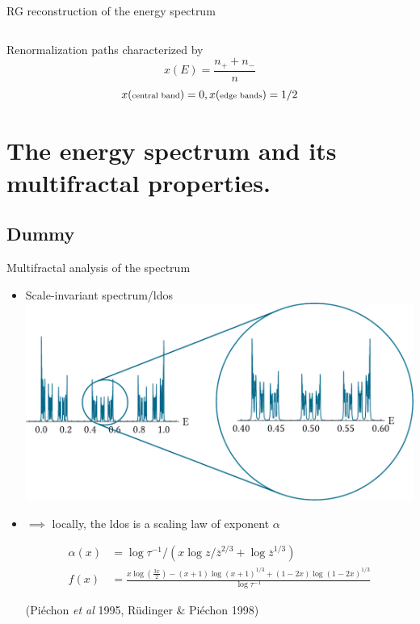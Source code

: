 \documentclass[xcolor=x11names,compress,professionalfonts]{beamer}
\renewcommand{\(}{\begin{columns}}
\renewcommand{\)}{\end{columns}}
\newcommand{\<}[1]{\begin{column}{#1}}
\renewcommand{\>}{\end{column}}
\newcommand{\zb}{\ensuremath{\overline{z}}}
\begin{document}
\begin{frame}{RG reconstruction of the energy spectrum}
\begin{columns}
\begin{column}{6cm}
	\end{column}
	\end{columns}
	Renormalization paths characterized by
	\[ 
		x(E) = \frac{n_+ + n_-}{n} 
	\]
	\[ 
		x(\text{\scriptsize{central band}}) = 0, x(\text{\scriptsize{edge bands}}) = 1/2
	\]
\end{frame}

\section{The energy spectrum and its multifractal properties.}
\subsection{Dummy}

\begin{frame}{Multifractal analysis of the spectrum}

	\begin{itemize}
		\item Scale-invariant spectrum/ldos
		\includegraphics[scale=.4]{ldos.pdf}
		
		\item $\implies$ locally, the ldos is a scaling law of exponent $\alpha$
	
		\begin{align*}
		\alpha(x) &= \log \tau^{-1}/\left( x \log z/\zb^{2/3} + \log \zb^{1/3} \right) \\
		f(x) &= \frac{x \log \left(\frac{3 x}{2}\right)- (x+1) \log (x+1)^{1/3}+ (1-2 x) \log (1-2 x)^{1/3}}{\log \tau^{-1}}
	\end{align*}
	\begin{flushright}
	(Piéchon \emph{et al} 1995, Rüdinger \& Piéchon 1998)
	\end{flushright}
	\end{itemize}
\end{frame}
\end{document}
